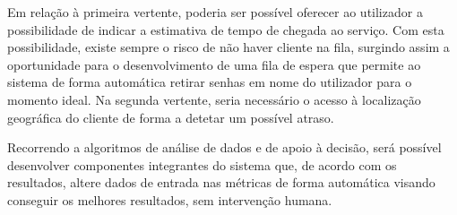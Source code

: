 Em relação à primeira vertente, poderia ser possível oferecer ao utilizador a possibilidade de indicar a estimativa de tempo de chegada ao serviço. Com esta possibilidade, existe sempre o risco de não haver cliente na fila, surgindo assim a oportunidade para o desenvolvimento de uma fila de espera que permite ao sistema de forma automática retirar senhas em nome do utilizador para o momento ideal. Na segunda vertente, seria necessário o acesso à localização geográfica do cliente de forma a detetar um possível atraso. 

Recorrendo a algoritmos de análise de dados e de apoio à decisão, será possível desenvolver componentes integrantes do sistema que, de acordo com os resultados, altere dados de entrada nas métricas de forma automática visando conseguir os melhores resultados, sem intervenção humana.








